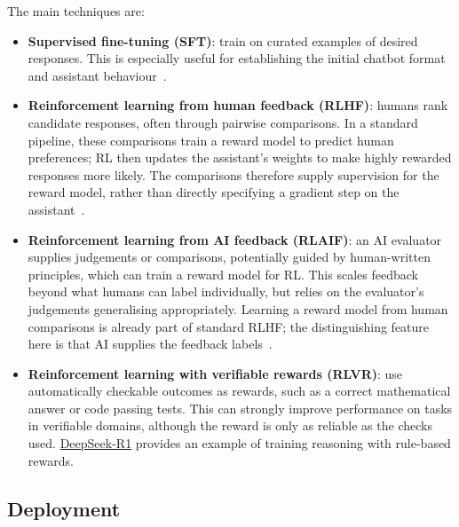 The main techniques are:
\begin{itemize}
  \item \textbf{Supervised fine-tuning (SFT)}: train on curated examples of desired responses. This is especially useful for establishing the initial chatbot format and assistant behaviour~\cite{ouyang2022instructgpt}.
  \item \textbf{Reinforcement learning from human feedback (RLHF)}: humans rank candidate responses, often through pairwise comparisons. In a standard pipeline, these comparisons train a reward model to predict human preferences; RL then updates the assistant's weights to make highly rewarded responses more likely. The comparisons therefore supply supervision for the reward model, rather than directly specifying a gradient step on the assistant~\cite{ouyang2022instructgpt}.
  \item \textbf{Reinforcement learning from AI feedback (RLAIF)}: an AI evaluator supplies judgements or comparisons, potentially guided by human-written principles, which can train a reward model for RL. This scales feedback beyond what humans can label individually, but relies on the evaluator's judgements generalising appropriately. Learning a reward model from human comparisons is already part of standard RLHF; the distinguishing feature here is that AI supplies the feedback labels~\cite{bai2022constitutional}.
  \item \textbf{Reinforcement learning with verifiable rewards (RLVR)}: use automatically checkable outcomes as rewards, such as a correct mathematical answer or code passing tests. This can strongly improve performance on tasks in verifiable domains, although the reward is only as reliable as the checks used. \href{https://arxiv.org/abs/2501.12948}{DeepSeek-R1} provides an example of training reasoning with rule-based rewards.
\end{itemize}

\subsection{Deployment}


